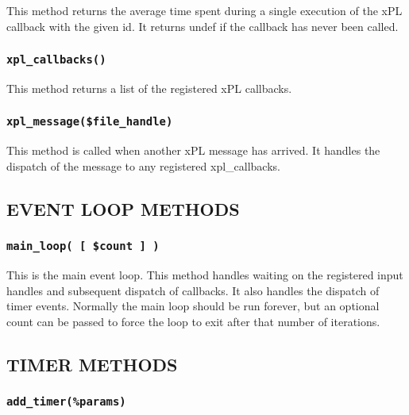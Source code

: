 \documentclass[12pt,a4paper]{article}
\begin{document}
This method returns the average time spent during a single execution
of the xPL callback with the given id.  It returns undef if the
callback has never been called.

\subsubsection*{\texttt{xpl\_callbacks()}\label{xPL::Listener_xpl_callbacks_}}


This method returns a list of the registered xPL callbacks.

\subsubsection*{\texttt{xpl\_message(\$file\_handle)}\label{xPL::Listener_xpl_message_file_handle_}}


This method is called when another xPL message has arrived.  It handles
the dispatch of the message to any registered xpl\_callbacks.

\subsection*{EVENT LOOP METHODS\label{xPL::Listener_EVENT_LOOP_METHODS}}
\subsubsection*{\texttt{main\_loop( [ \$count ] )}\label{xPL::Listener_main_loop_count_}}


This is the main event loop.  This method handles waiting on the
registered input handles and subsequent dispatch of callbacks.  It
also handles the dispatch of timer events.  Normally the main loop
should be run forever, but an optional count can be passed to
force the loop to exit after that number of iterations.

\subsection*{TIMER METHODS\label{xPL::Listener_TIMER_METHODS}}
\subsubsection*{\texttt{add\_timer(\%params)}\label{xPL::Listener_add_timer_params_}}
\end{document}
